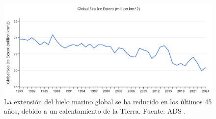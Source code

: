 \documentclass[10pt,twocolumn,letterpaper]{article}
\begin{document}
\begin{figure}[t]
\begin{center}
\includegraphics[width=1\textwidth]{ice.jpg}
\end{center}
   \caption{La extensión del hielo marino global se ha reducido en los últimos 45 años, debido a un calentamiento de la Tierra. Fuente: ADS \cite{149}.}
\label{fig:24}
\end{figure}

\clearpage
\twocolumn

{\small


}
\end{document}

